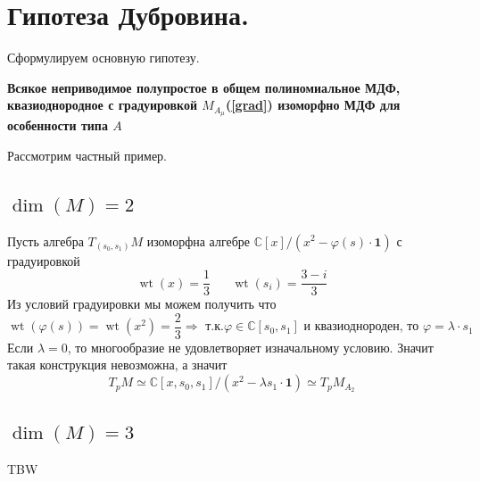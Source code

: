 \section{Гипотеза Дубровина.}
Сформулируем основную гипотезу. \par 
\begin{center}
	\textbf{
		Всякое неприводимое полупростое в общем полиномиальное МДФ, квазиоднородное с градуировкой \(M_{A_\mu}\)(\ref{grad}) изоморфно МДФ для особенности типа \(A\)}
\end{center}
Рассмотрим частный пример.
\subsection{\texorpdfstring{\(\operatorname{dim}(M) = 2\)}{2}}
Пусть алгебра \(T_{(s_0, s_1)}M\) изоморфна алгебре \(\mathbb{C}[x]\Big/(x^2 - \varphi(s)\cdot \mathbf{1})\) с градуировкой \[\operatorname{wt}(x) = \dfrac{1}{3} \hspace{20pt} \operatorname{wt}(s_i) = \dfrac{3 - i}{3}\]
Из условий градуировки мы можем получить что \[\operatorname{wt}(\varphi(s)) = \operatorname{wt}(x^2) = \dfrac{2}{3} \Rightarrow \text{ т.к.} \varphi \in \mathbb{C}[s_0, s_1] \text{ и квазиоднороден, то } \varphi = \lambda \cdot s_1\]
Если \(\lambda = 0\), то многообразие не удовлетворяет изначальному условию. Значит такая конструкция невозможна, а значит \[T_pM \simeq \mathbb{C}[x, s_0, s_1]\Big/(x^2 - \lambda s_1\cdot \mathbf{1}) \simeq T_pM_{A_2}\]

\subsection{\texorpdfstring{\(\operatorname{dim}(M) = 3\)}{3}}
TBW